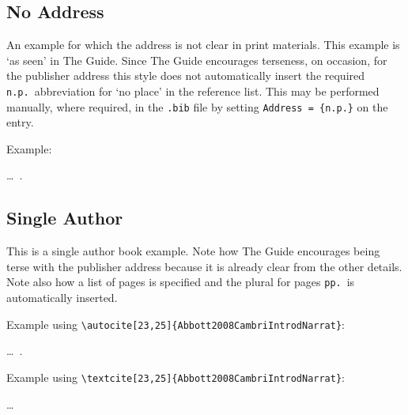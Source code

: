 \documentclass[a4paper, 11pt]{article}
\newcommand*{\subsectionRefSection}[1]{
    \subsection{#1}
    \refsection
}
\newcommand*{\printsubbibliographyEndRefSection}{
    \printbibliography[heading=subbibliography, title=Reference]
    \endrefsection
}
\newenvironment{agpsExample}{
    \setlength{\parindent}{0pt}
    \medskip
}
{}
\newenvironment{bareList}{%
    \begin{list}{}{}%
}
{\end{list}}
\begin{document}
\printsubbibliographyEndRefSection

\subsectionRefSection{No Address}

An example for which the address is not clear in print materials. This example is `as seen' in The
Guide. Since The Guide encourages terseness, on occasion, for the publisher address this style does
not automatically insert the required \texttt{n.p.}\ abbreviation for `no place' in the reference
list. This may be performed manually, where required, in the \texttt{.bib} file by setting
\verb|Address = {n.p.}| on the entry.

\begin{agpsExample}

    Example:

    \begin{bareList}
        \item \ldots\ \autocite{SnooksCo2002StyleManualAuthor}.
    \end{bareList}

\end{agpsExample}

\printsubbibliographyEndRefSection

\subsectionRefSection{Single Author}

This is a single author book example. Note how The Guide encourages being terse with the publisher
address because it is already clear from the other details. Note also how a list of pages is
specified and the plural for pages \texttt{pp.}\ is automatically inserted.

\begin{agpsExample}

    Example using \verb|\autocite[23,25]{Abbott2008CambriIntrodNarrat}|:

    \begin{bareList}
        \item \ldots\ \autocite[23,25]{Abbott2008CambriIntrodNarrat}.
    \end{bareList}

    Example using \verb|\textcite[23,25]{Abbott2008CambriIntrodNarrat}|:

    \begin{bareList}
        \item \textcite[23,25]{Abbott2008CambriIntrodNarrat} \ldots
    \end{bareList}

\end{agpsExample}
\end{document}
